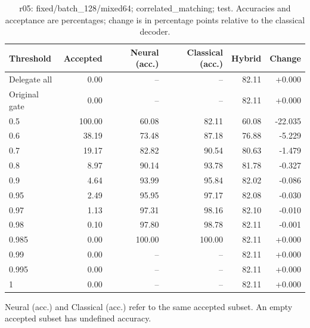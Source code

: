 \begin{table}[htbp]
\centering\small
\setlength{\tabcolsep}{3pt}
\caption{r05: fixed/batch\_128/mixed64; correlated\_matching; test. Accuracies and acceptance are percentages; change is in percentage points relative to the classical decoder.}
\begin{tabular}{lrrrrr}
\toprule
Threshold & Accepted & Neural (acc.) & Classical (acc.) & Hybrid & Change \\
\midrule
Delegate all & 0.00 & -- & -- & 82.11 & +0.000 \\
Original gate & 0.00 & -- & -- & 82.11 & +0.000 \\
0.5 & 100.00 & 60.08 & 82.11 & 60.08 & -22.035 \\
0.6 & 38.19 & 73.48 & 87.18 & 76.88 & -5.229 \\
0.7 & 19.17 & 82.82 & 90.54 & 80.63 & -1.479 \\
0.8 & 8.97 & 90.14 & 93.78 & 81.78 & -0.327 \\
0.9 & 4.64 & 93.99 & 95.84 & 82.02 & -0.086 \\
0.95 & 2.49 & 95.95 & 97.17 & 82.08 & -0.030 \\
0.97 & 1.13 & 97.31 & 98.16 & 82.10 & -0.010 \\
0.98 & 0.10 & 97.80 & 98.78 & 82.11 & -0.001 \\
0.985 & 0.00 & 100.00 & 100.00 & 82.11 & +0.000 \\
0.99 & 0.00 & -- & -- & 82.11 & +0.000 \\
0.995 & 0.00 & -- & -- & 82.11 & +0.000 \\
1 & 0.00 & -- & -- & 82.11 & +0.000 \\
\bottomrule
\end{tabular}
\par\smallskip\footnotesize Neural (acc.) and Classical (acc.) refer to the same accepted subset. An empty accepted subset has undefined accuracy.
\end{table}
